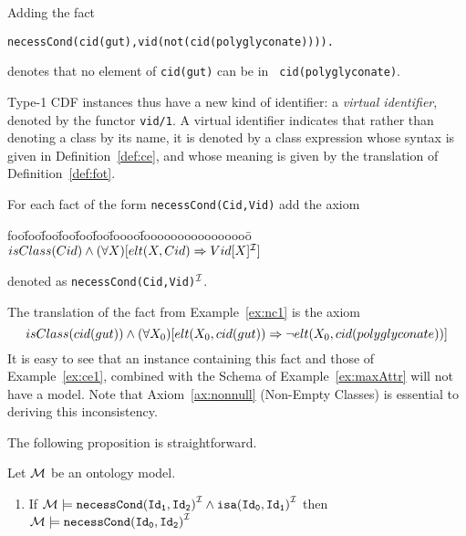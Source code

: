 \begin{example} \rm  \label{ex:nc1}
Adding the fact

{\tt necessCond(cid(gut),vid(not(cid(polyglyconate)))). }

denotes that no element of {\tt cid(gut)} can be in {\tt
cid(polyglyconate)}.
\end{example}

Type-1 CDF instances thus have a new kind of identifier: a {\em
virtual identifier}, denoted by the functor {\tt vid/1}.  A virtual
identifier indicates that rather than denoting a class by its name, it
is denoted by a class expression whose syntax is given in
Definition~\ref{def:ce}, and whose meaning is given by the translation
of Definition~\ref{def:fot}.

\begin{instance}  \rm 
For each fact of the form {\tt necessCond(Cid,Vid)} add the axiom
\ \\
\begin{tabbing}
foo\=foo\=foo\=foo\=foo\=foo\=foooo\=foooooooooooooooo\=\kill
\> $ isClass(Cid) \wedge 
	(\forall X) [elt(X,Cid) \Rightarrow Vid[X]^{{\cal I}}]$ 
\end{tabbing}
denoted as {\tt necessCond(Cid,Vid)}$^{{\cal I}}$.
\end{instance}

\begin{example} \rm 
The translation of the fact from Example~\ref{ex:nc1} is the axiom
\[
isClass(cid(gut)) \wedge (\forall X_0) [elt(X_0,cid(gut)) \Rightarrow 
					\neg elt(X_0,cid(polyglyconate))]
\]
It is easy to see that an instance containing this fact and those of
Example~\ref{ex:ce1}, combined with the Schema of
Example~\ref{ex:maxAttr} will not have a model.  Note that
Axiom~\ref{ax:nonnull} (Non-Empty Classes) is essential to deriving
this inconsistency.
\end{example}

The following proposition is straightforward.

\begin{proposition} 
\label{prop:necesscondinh}\rm
Let ${\cal M}$ be an ontology model.
\begin{enumerate}
\item If ${\cal M} \models {\tt necessCond(Id_1,Id_2)}^{{\cal I}} \wedge
						{\tt isa(Id_0,Id_1)}^{{\cal I}}$ 
	then ${\cal M} \models  {\tt necessCond(Id_0,Id_2)}^{{\cal I}}$
\end{enumerate}
\end{proposition}

